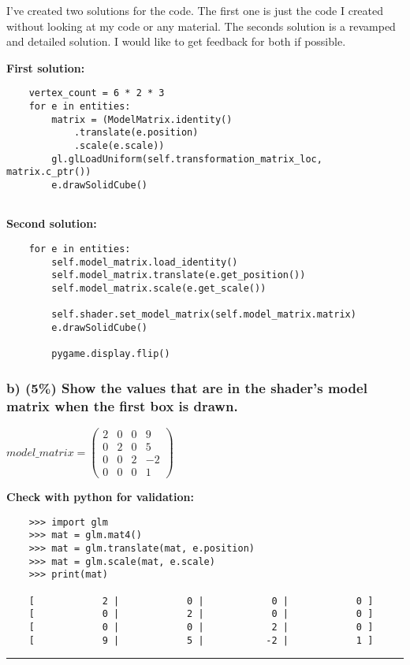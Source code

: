I've created two solutions for the code. The first one is just the code I created without looking at my code or any material. The seconds solution is a revamped and detailed solution. I would like to get feedback for both if possible.

\textbf{First solution:}
\begin{verbatim}
    vertex_count = 6 * 2 * 3
    for e in entities:
        matrix = (ModelMatrix.identity()
            .translate(e.position)
            .scale(e.scale))
        gl.glLoadUniform(self.transformation_matrix_loc, matrix.c_ptr())
        e.drawSolidCube()
    
\end{verbatim}

\textbf{Second solution:}
\begin{verbatim}
    for e in entities:
        self.model_matrix.load_identity()
        self.model_matrix.translate(e.get_position())
        self.model_matrix.scale(e.get_scale())

        self.shader.set_model_matrix(self.model_matrix.matrix)
        e.drawSolidCube()

        pygame.display.flip()

\end{verbatim}

\subsubsection{b)  (5\%) Show the values that are in the shader’s model matrix when the first box is drawn.}

$ model\_matrix = \left(\begin{array}{cccc}2&0&0&9\\0&2&0&5\\0&0&2&-2\\0&0&0&1\end{array}\right) $

\textbf{Check with python for validation:}
\begin{verbatim}
    >>> import glm
    >>> mat = glm.mat4()
    >>> mat = glm.translate(mat, e.position)
    >>> mat = glm.scale(mat, e.scale)
    >>> print(mat)
    
    [            2 |            0 |            0 |            0 ]
    [            0 |            2 |            0 |            0 ]
    [            0 |            0 |            2 |            0 ]
    [            9 |            5 |           -2 |            1 ]
\end{verbatim}
\rule{\textwidth}{0.2mm}

